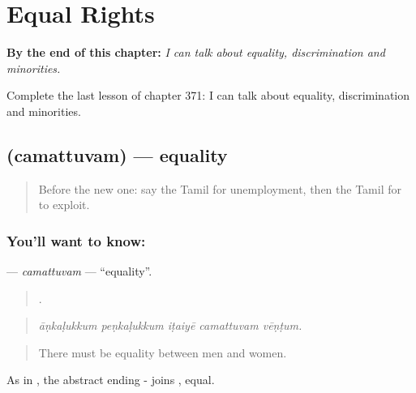 
\chapter{Equal Rights}
\label{ch:ta-equal-rights}

\begin{chapteropening}
\textbf{By the end of this chapter:} \emph{I can talk about equality, discrimination and minorities.}

Complete the last lesson of chapter 371: I can talk about equality, discrimination and minorities.
\end{chapteropening}

\section[\texorpdfstring{\ta{சமத்துவம்} (camattuvam)}{சமத்துவம் (camattuvam)}]{ (camattuvam) — equality}

\label{lesson:TA-C371-camattuvam}



\begin{quote}
Before the new one: say the Tamil for unemployment, then the Tamil for to exploit.
\end{quote}

\subsection*{You'll want to know: }
\textbf{} — \emph{camattuvam} — \textquotedblleft{}equality\textquotedblright{}.

\begin{quote}
    .
\end{quote}

\begin{quote}
\emph{āṇkaḷukkum peṇkaḷukkum iṭaiyē camattuvam vēṇṭum.}
\end{quote}

\begin{quote}
There must be equality between men and women.
\end{quote}

As in , the abstract ending - joins , equal.

